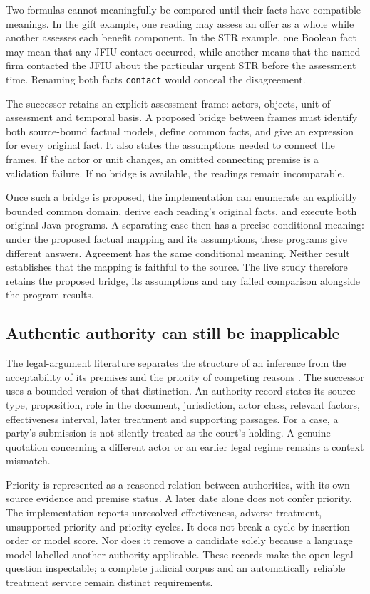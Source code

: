 \documentclass[12pt,a4paper,oneside,openany]{book}
\begin{document}
Two formulas cannot meaningfully be compared until their facts have compatible
meanings. In the gift example, one reading may assess an offer as a whole while
another assesses each benefit component. In the STR example, one Boolean fact
may mean that any JFIU contact occurred, while another means that the named firm
contacted the JFIU about the particular urgent STR before the assessment time.
Renaming both facts \texttt{contact} would conceal the disagreement.

The successor retains an explicit assessment frame: actors, objects, unit of
assessment and temporal basis. A proposed bridge between frames must identify
both source-bound factual models, define common facts, and give an expression
for every original fact. It also states the assumptions needed to connect the
frames. If the actor or unit changes, an omitted connecting premise is a
validation failure. If no bridge is available, the readings remain incomparable.

Once such a bridge is proposed, the implementation can enumerate an explicitly
bounded common domain, derive each reading's original facts, and execute both
original Java programs. A separating case then has a precise conditional
meaning: under the proposed factual mapping and its assumptions, these programs
give different answers. Agreement has the same conditional meaning. Neither
result establishes that the mapping is faithful to the source. The live study
therefore retains the proposed bridge, its assumptions and any failed comparison
alongside the program results.

\subsection{Authentic authority can still be inapplicable}

The legal-argument literature separates the structure of an inference from the
acceptability of its premises and the priority of competing reasons
\citep[secs.~2--3]{aspic2010}\citep[secs.~3--6]{carneades2007}.
The successor uses a bounded version of that distinction. An authority record
states its source type, proposition, role in the document, jurisdiction, actor
class, relevant factors, effectiveness interval, later treatment and supporting
passages. For a case, a party's submission is not silently treated as the
court's holding. A genuine quotation concerning a different actor or an earlier
legal regime remains a context mismatch.

Priority is represented as a reasoned relation between authorities, with its
own source evidence and premise status. A later date alone does not confer
priority. The implementation reports unresolved effectiveness, adverse treatment,
unsupported priority and priority cycles. It does not break a cycle by insertion
order or model score. Nor does it remove a candidate solely because a language
model labelled another authority applicable. These records make the open legal
question inspectable; a complete judicial corpus and an automatically reliable
treatment service remain distinct requirements.
\end{document}
